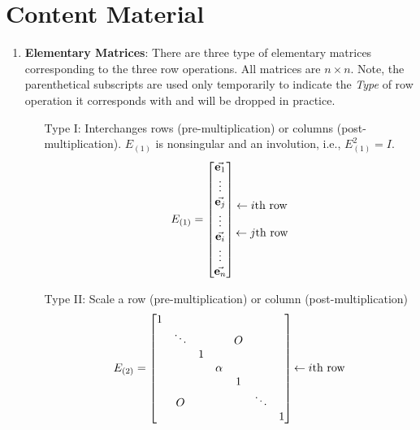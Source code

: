 \section*{Content Material}

\begin{enumerate}
\item  \textbf{Elementary Matrices}:  There are three type of elementary matrices corresponding to the three row operations.  All matrices are $n \times n$.  Note, the parenthetical subscripts are used only temporarily to indicate the \textit{Type} of row operation it corresponds with and will be dropped in practice. 

\begin{enumerate}
	\item[Type I:]  Interchanges rows (pre-multiplication) or columns (post-multiplication).  $E_{(1)}$ is nonsingular and an involution, i.e., $E_{(1)}^2 = I$.
	\[ E_{(1)} = 	\begin{bmatrix}   \vec{{\bf e}_1} \\   \vdots \\ \vec{{\bf e}_j} \\ \vdots \\ \vec{{\bf e}_i} \\ \vdots \\ \vec{{\bf e}_n} \end{bmatrix}  \begin{matrix}  \text{ \; }   \\   \text{ \; }   \\     \leftarrow i \text{th row} \\ \text{ \; }  \\ \leftarrow  j \text{th row} \\  \text{ \; }  \\ \text{ \; }  \end{matrix}  \]	
	
	
	\item[Type II:]  Scale a row (pre-multiplication) or column (post-multiplication)
	\[ E_{(2)} = \begin{bmatrix}  1 &  &  &    & & &   \\  &  \ddots & & & O  & & \\ & & 1 & & & &  \\ & & & \alpha & & & \\  & & & & 1 & & \\ & O & & & & \ddots & \\ & & & & & & 1   \end{bmatrix}  \begin{matrix} \text{ \; }   \\   \text{ \; }   \\   \text{ \; }  \\  \leftarrow  i \text{th row}    \\ \text{ \; } \\ \text{ \; }  \\ \text{ \; } \end{matrix}  \]
	

\end{enumerate}
\end{enumerate}
